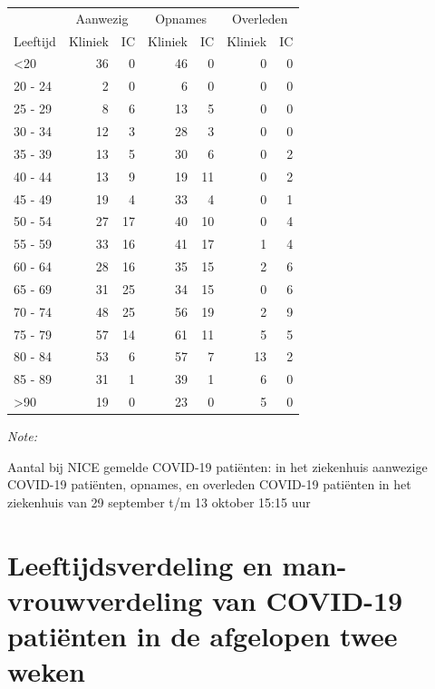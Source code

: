 \documentclass[
  english,
  man,floatsintext]{apa6}
\begin{document}
\begin{table}
\centering\begingroup\fontsize{10}{12}\selectfont

\begin{threeparttable}
\begin{tabular}{lrrrrrr}
\toprule
\multicolumn{1}{c}{ } & \multicolumn{2}{c}{Aanwezig} & \multicolumn{2}{c}{Opnames} & \multicolumn{2}{c}{Overleden} \\
\cmidrule(l{3pt}r{3pt}){2-3} \cmidrule(l{3pt}r{3pt}){4-5} \cmidrule(l{3pt}r{3pt}){6-7}
Leeftijd & Kliniek & IC & Kliniek & IC & Kliniek & IC\\
\midrule
<20 & 36 & 0 & 46 & 0 & 0 & 0\\
20 - 24 & 2 & 0 & 6 & 0 & 0 & 0\\
25 - 29 & 8 & 6 & 13 & 5 & 0 & 0\\
30 - 34 & 12 & 3 & 28 & 3 & 0 & 0\\
35 - 39 & 13 & 5 & 30 & 6 & 0 & 2\\
40 - 44 & 13 & 9 & 19 & 11 & 0 & 2\\
45 - 49 & 19 & 4 & 33 & 4 & 0 & 1\\
50 - 54 & 27 & 17 & 40 & 10 & 0 & 4\\
55 - 59 & 33 & 16 & 41 & 17 & 1 & 4\\
60 - 64 & 28 & 16 & 35 & 15 & 2 & 6\\
65 - 69 & 31 & 25 & 34 & 15 & 0 & 6\\
70 - 74 & 48 & 25 & 56 & 19 & 2 & 9\\
75 - 79 & 57 & 14 & 61 & 11 & 5 & 5\\
80 - 84 & 53 & 6 & 57 & 7 & 13 & 2\\
85 - 89 & 31 & 1 & 39 & 1 & 6 & 0\\
>90 & 19 & 0 & 23 & 0 & 5 & 0\\
\bottomrule
\end{tabular}
\begin{tablenotes}
\item \textit{Note: } 
\item Aantal bij NICE gemelde COVID-19 patiënten: in het ziekenhuis aanwezige COVID-19 patiënten, opnames, en overleden COVID-19 patiënten in het ziekenhuis van 29 september t/m 13 oktober 15:15 uur
\end{tablenotes}
\end{threeparttable}
\endgroup{}
\end{table}

\newpage

\hypertarget{leeftijdsverdeling-en-man-vrouwverdeling-van-covid-19-patiuxebnten-in-de-afgelopen-twee-weken}{%
\section{Leeftijdsverdeling en man-vrouwverdeling van COVID-19 patiënten in de afgelopen twee weken}\label{leeftijdsverdeling-en-man-vrouwverdeling-van-covid-19-patiuxebnten-in-de-afgelopen-twee-weken}}
\end{document}
